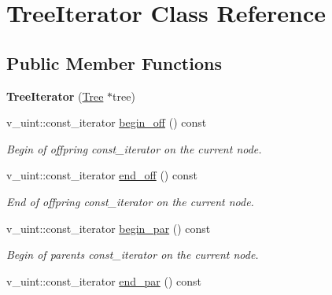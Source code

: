 \hypertarget{classTreeIterator}{}\section{Tree\+Iterator Class Reference}
\label{classTreeIterator}
\subsection*{Public Member Functions}
\begin{DoxyCompactItemize}
\item 
{\bfseries Tree\+Iterator} (\hyperlink{classTree}{Tree} $\ast$tree)\hypertarget{classTreeIterator_a743f2a767abbac4da1fcc5b4029b94f2}{}\label{classTreeIterator_a743f2a767abbac4da1fcc5b4029b94f2}

\item 
v\+\_\+uint\+::const\+\_\+iterator \hyperlink{classTreeIterator_a5489e283acdd398f614a25d14448a8f3}{begin\+\_\+off} () const \hypertarget{classTreeIterator_a5489e283acdd398f614a25d14448a8f3}{}\label{classTreeIterator_a5489e283acdd398f614a25d14448a8f3}

\begin{DoxyCompactList}\small\item\em Begin of offpring {\ttfamily const\+\_\+iterator} on the current node. \end{DoxyCompactList}\item 
v\+\_\+uint\+::const\+\_\+iterator \hyperlink{classTreeIterator_a9f9df3d3c75c8d16f5d1768a6675a41d}{end\+\_\+off} () const \hypertarget{classTreeIterator_a9f9df3d3c75c8d16f5d1768a6675a41d}{}\label{classTreeIterator_a9f9df3d3c75c8d16f5d1768a6675a41d}

\begin{DoxyCompactList}\small\item\em End of offpring {\ttfamily const\+\_\+iterator} on the current node. \end{DoxyCompactList}\item 
v\+\_\+uint\+::const\+\_\+iterator \hyperlink{classTreeIterator_a3cb8dd28630f065472e135f7db822abf}{begin\+\_\+par} () const \hypertarget{classTreeIterator_a3cb8dd28630f065472e135f7db822abf}{}\label{classTreeIterator_a3cb8dd28630f065472e135f7db822abf}

\begin{DoxyCompactList}\small\item\em Begin of parents {\ttfamily const\+\_\+iterator} on the current node. \end{DoxyCompactList}\item 
v\+\_\+uint\+::const\+\_\+iterator \hyperlink{classTreeIterator_aac5656fc5b550cb8dfa4a9ebd5ea910a}{end\+\_\+par} () const \hypertarget{classTreeIterator_aac5656fc5b550cb8dfa4a9ebd5ea910a}{}\label{classTreeIterator_aac5656fc5b550cb8dfa4a9ebd5ea910a}


\end{DoxyCompactItemize}
